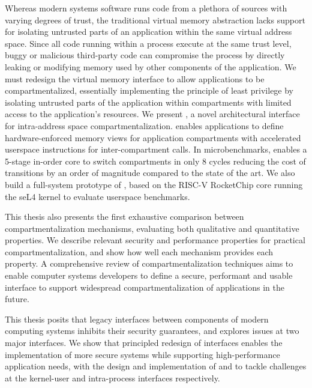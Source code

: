 Whereas modern systems software runs code from a plethora of sources with
varying degrees of trust, the traditional virtual memory abstraction lacks
support for isolating untrusted parts of an application within the same 
virtual address space.
Since all code running within a process execute at the same trust level,
buggy or malicious third-party code can compromise
the process by directly leaking or modifying memory used by other components 
of the application.
We must redesign the virtual memory interface to allow applications to
be compartmentalized, essentially implementing the principle of least privilege
by isolating untrusted parts of the application within compartments with 
limited access to the application's resources.
We present \seccells, a novel architectural interface for intra-address space
compartmentalization.
\seccells enables applications to define hardware-enforced memory views for 
application compartments with 
accelerated userspace instructions for inter-compartment calls.
In microbenchmarks, \seccells enables a 5-stage in-order core to switch 
compartments in only 8 cycles reducing the cost of transitions by an order
of magnitude compared to the state of the art.
We also build a full-system prototype of \seccells, based on the RISC-V 
RocketChip core running the seL4 kernel to evaluate userspace benchmarks.

This thesis also presents the first exhaustive comparison between 
compartmentalization mechanisms, evaluating both qualitative and quantitative
properties.
We describe relevant security and performance properties for practical
compartmentalization, and show how well each mechanism provides each
property.
A comprehensive review of compartmentalization techniques aims to enable
computer systems developers to define a secure, performant and usable interface
to support widespread compartmentalization of applications in the future.

This thesis posits that legacy interfaces between components of modern
computing systems inhibits their security guarantees, and explores issues
at two major interfaces.
We show that principled redesign of interfaces enables the implementation of
more secure systems while supporting high-performance application needs,
with the design and implementation of \midas and \seccells to tackle challenges
at the kernel-user and intra-process interfaces respectively.

